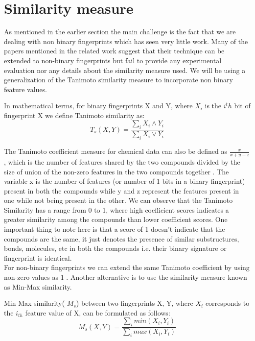 \section{Similarity measure}

As mentioned in the earlier section the main challenge is the fact that we are dealing with non binary fingerprints which has seen very little work. Many of the papers mentioned in the related work suggest that their technique can be extended to non-binary fingerprints but fail to provide any experimental evaluation nor any details about the similarity measure used. We will be using a generalization of the Tanimoto similarity measure to incorporate non binary feature values. \\

\begin{dfn}
In mathematical terms, for binary fingerprints X and Y, where $X_i$ is the $i^th$ bit of fingerprint X we define Tanimoto similarity as: \\
\begin{equation}
\label{eq:tan}
T_s(X,Y) = \frac{\sum \limits_i X_i \wedge Y_i} {\sum \limits_i X_i \vee Y_i} 
\end{equation}
\end{dfn}

The Tanimoto coefficient measure for chemical data can also be defined  as $\frac{x}{x+y+z}$, which is the number of features shared by the two compounds divided by the size of union of the non-zero features in the two compounds together . The variable x is the number of features (or number of 1-bits in a binary fingerprint) present in both the compounds while y and z represent the features present in one while not being present in the other. We can observe that the Tanimoto Similarity has a range from 0 to 1, where high coefficient scores indicates a greater similarity among the compounds than lower coefficient scores. One important thing to note here is that a score of 1 doesn't indicate that the compounds are the same, it just denotes the presence of similar substructures, bonds, molecules, etc in both the compounds i.e. their binary signature or fingerprint is identical. \\

For non-binary fingerprints we can extend the same Tanimoto coefficient by using non-zero values as 1 . Another alternative is to use the similarity measure known as Min-Max similarity.\\
 
\begin{dfn}
Min-Max similarity( $M_s$) between two fingerprints X, Y, where $X_i$ corresponds to the $i_{th}$ feature value of X, can be formulated as follows: \\
\begin{equation}
\label{eq:minmax}
 M_s(X,Y) = \frac{\sum \limits_{i} min(X_i, Y_i)}{\sum \limits_{i} max(X_i, Y_i)}
\end{equation}
\end{dfn}

